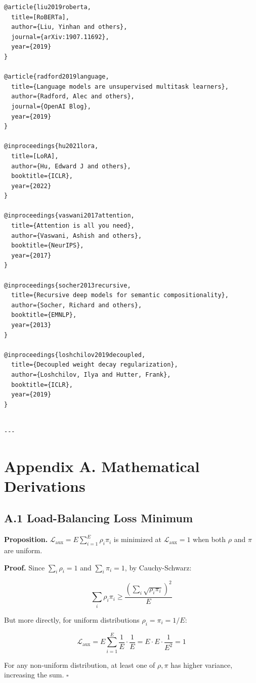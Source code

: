 \begin{lstlisting}
@article{liu2019roberta,
  title=[RoBERTa],
  author={Liu, Yinhan and others},
  journal={arXiv:1907.11692},
  year={2019}
}

@article{radford2019language,
  title={Language models are unsupervised multitask learners},
  author={Radford, Alec and others},
  journal={OpenAI Blog},
  year={2019}
}

@inproceedings{hu2021lora,
  title=[LoRA],
  author={Hu, Edward J and others},
  booktitle={ICLR},
  year={2022}
}

@inproceedings{vaswani2017attention,
  title={Attention is all you need},
  author={Vaswani, Ashish and others},
  booktitle={NeurIPS},
  year={2017}
}

@inproceedings{socher2013recursive,
  title={Recursive deep models for semantic compositionality},
  author={Socher, Richard and others},
  booktitle={EMNLP},
  year={2013}
}

@inproceedings{loshchilov2019decoupled,
  title={Decoupled weight decay regularization},
  author={Loshchilov, Ilya and Hutter, Frank},
  booktitle={ICLR},
  year={2019}
}
\end{lstlisting}
\begin{lstlisting}

---
\end{lstlisting}

\section{Appendix A. Mathematical Derivations}

\subsection{A.1 Load-Balancing Loss Minimum}

\textbf{Proposition.} $\mathcal{L}_\text{aux} = E \sum_{i=1}^{E} \rho_i \pi_i$ 
is minimized at $\mathcal{L}_\text{aux} = 1$ when both $\rho$ and $\pi$ are 
uniform.

\textbf{Proof.} Since $\sum_i \rho_i = 1$ and $\sum_i \pi_i = 1$, by Cauchy-Schwarz:

\[
\sum_i \rho_i \pi_i \geq \frac{(\sum_i \sqrt{\rho_i \pi_i})^2}{E}
\]

But more directly, for uniform distributions $\rho_i = \pi_i = 1/E$:

\[
\mathcal{L}_\text{aux} = E \sum_{i=1}^{E} \frac{1}{E} \cdot \frac{1}{E} = E \cdot E \cdot \frac{1}{E^2} = 1
\]

For any non-uniform distribution, at least one of $\rho, \pi$ has higher 
variance, increasing the sum. $\square$

